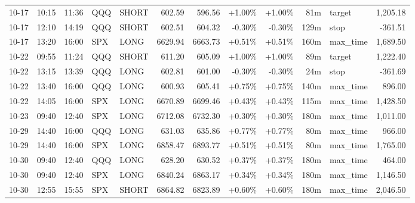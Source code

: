 \documentclass[11pt,a4paper]{article}
\begin{document}
\begin{center}
\begin{longtable}{>{\color{txtmain}}l l l l l r r r r r >{\color{txtmain}}l r}
10-17 & 10:15 & 11:36 & QQQ & SHORT & 602.59 & 596.56 & \textcolor{wingreen}{+1.00\%} & \textcolor{wingreen}{+1.00\%} & 81m & target & \textcolor{wingreen}{1,205.18} \\
10-17 & 12:10 & 14:19 & QQQ & SHORT & 602.51 & 604.32 & \textcolor{lossred}{-0.30\%} & \textcolor{lossred}{-0.30\%} & 129m & stop & \textcolor{lossred}{-361.51} \\
10-17 & 13:20 & 16:00 & SPX & LONG & 6629.94 & 6663.73 & \textcolor{wingreen}{+0.51\%} & \textcolor{wingreen}{+0.51\%} & 160m & max\_time & \textcolor{wingreen}{1,689.50} \\
10-22 & 09:55 & 11:24 & QQQ & SHORT & 611.20 & 605.09 & \textcolor{wingreen}{+1.00\%} & \textcolor{wingreen}{+1.00\%} & 89m & target & \textcolor{wingreen}{1,222.40} \\
10-22 & 13:15 & 13:39 & QQQ & LONG & 602.81 & 601.00 & \textcolor{lossred}{-0.30\%} & \textcolor{lossred}{-0.30\%} & 24m & stop & \textcolor{lossred}{-361.69} \\
10-22 & 13:40 & 16:00 & QQQ & LONG & 600.93 & 605.41 & \textcolor{wingreen}{+0.75\%} & \textcolor{wingreen}{+0.75\%} & 140m & max\_time & \textcolor{wingreen}{896.00} \\
10-22 & 14:05 & 16:00 & SPX & LONG & 6670.89 & 6699.46 & \textcolor{wingreen}{+0.43\%} & \textcolor{wingreen}{+0.43\%} & 115m & max\_time & \textcolor{wingreen}{1,428.50} \\
10-23 & 09:40 & 12:40 & SPX & LONG & 6712.08 & 6732.30 & \textcolor{wingreen}{+0.30\%} & \textcolor{wingreen}{+0.30\%} & 180m & max\_time & \textcolor{wingreen}{1,011.00} \\
10-29 & 14:40 & 16:00 & QQQ & LONG & 631.03 & 635.86 & \textcolor{wingreen}{+0.77\%} & \textcolor{wingreen}{+0.77\%} & 80m & max\_time & \textcolor{wingreen}{966.00} \\
10-29 & 14:40 & 16:00 & SPX & LONG & 6858.47 & 6893.77 & \textcolor{wingreen}{+0.51\%} & \textcolor{wingreen}{+0.51\%} & 80m & max\_time & \textcolor{wingreen}{1,765.00} \\
10-30 & 09:40 & 12:40 & QQQ & LONG & 628.20 & 630.52 & \textcolor{wingreen}{+0.37\%} & \textcolor{wingreen}{+0.37\%} & 180m & max\_time & \textcolor{wingreen}{464.00} \\
10-30 & 09:40 & 12:40 & SPX & LONG & 6840.24 & 6863.17 & \textcolor{wingreen}{+0.34\%} & \textcolor{wingreen}{+0.34\%} & 180m & max\_time & \textcolor{wingreen}{1,146.50} \\
10-30 & 12:55 & 15:55 & SPX & SHORT & 6864.82 & 6823.89 & \textcolor{wingreen}{+0.60\%} & \textcolor{wingreen}{+0.60\%} & 180m & max\_time & \textcolor{wingreen}{2,046.50} \\

\end{longtable}
\end{center}
\end{document}
